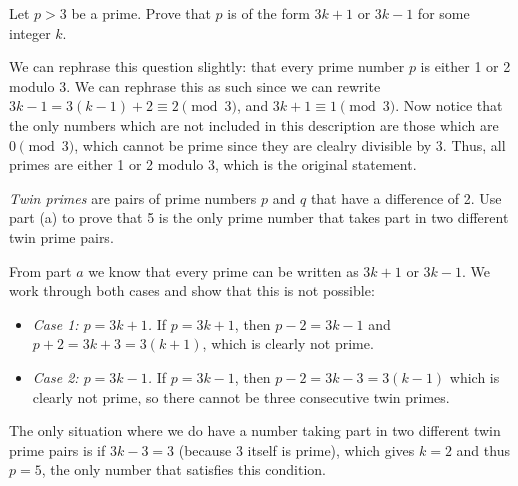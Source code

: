 \documentclass[11pt]{article}
\begin{document}

\begin{Parts}

\Part
Let $p > 3$ be a prime. Prove that $p$ is of the form $3k + 1$ or $3k-1$ for some integer $k$.

\begin{solution} 
    We can rephrase this question slightly: that every prime number $p$ is either 1 or 2 modulo 3. We can rephrase this as such since we can rewrite $3k - 1 = 3(k-1) + 2 \equiv 2 \pmod{3}$, and $3k+1 \equiv 1 \pmod{3}$. Now notice that the only numbers which are not included in this description are those which are $0 \pmod {3}$, which cannot be prime since they are clealry divisible by 3. Thus, all primes are either 1 or 2 modulo 3, which is the original statement.
\end{solution} 

\Part
\textit{Twin primes} are pairs of prime numbers $p$ and $q$ that have a difference of 2. Use part (a) to prove that 5 is the only prime number that takes part in two different twin prime pairs.

\begin{solution}
   From part $a$ we know that every prime can be written as $3k + 1$ or $3k - 1$. We work through both cases and show that this is not possible:

   \begin{itemize}
        \item \textit{Case 1: $p = 3k + 1$.} If $p = 3k + 1$, then $p - 2 = 3k - 1$ and $p + 2 = 3k+3 = 3(k+1)$, which is clearly not prime.
        \item \textit{Case 2: $p = 3k-1$.} If $p = 3k-1$, then $p - 2 = 3k - 3 = 3(k-1)$ which is clearly not prime, so there cannot be three consecutive twin primes.
   \end{itemize}

   The only situation where we do have a number taking part in two different twin prime pairs is if $3k - 3 = 3$ (because 3 itself is prime), which gives $k = 2$ and thus $p = 5$, the only number that satisfies this condition.
\end{solution}

\end{Parts}
\end{document}

